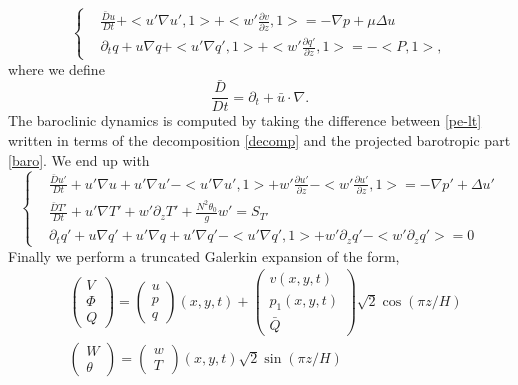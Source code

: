 \documentclass[11pt, a4paper, article,reqno,]{amsart}
\theoremstyle{remark}
\numberwithin{equation}{section}
\begin{document}
\begin{equation}\label{baro}
\left\{\begin{aligned}
    &\frac{\bar{D}u}{Dt} + < u' \nabla u', 1> + <w'\frac{\partial v}{\partial z},1> = -\nabla p + \mu \Delta u  \\
    & \partial_t q + u \nabla q + < u' \nabla q', 1 > + < w' \frac{\partial q'}{\partial z}, 1> = -<P,1>,
    \end{aligned}\right.
\end{equation}
where we define
\begin{equation*}
    \frac{\bar{D}}{Dt} = \partial_t + \bar u \cdot \nabla.
\end{equation*}
The baroclinic dynamics is computed by taking the difference between \eqref{pe-lt} written in terms of the decomposition \eqref{decomp} and the projected barotropic part \eqref{baro}. We end up with
\begin{equation}\label{barocli}
    \left\{\begin{aligned}
    &\frac{\bar{D}u'}{Dt} + u' \nabla u + u' \nabla u' - < u' \nabla u', 1> + w' \frac{\partial u'}{\partial z} - <w' \frac{\partial u'}{\partial z},1> = -\nabla p' + \Delta u'  \\
   & \frac{\bar{D}T'}{Dt} + u' \nabla T' + w' \partial_z T' + \frac{N^2\theta_0}{g} w' = S_{T'} \\
   &  \partial_t q' + u \nabla q' + u' \nabla q + u' \nabla q' - < u'\nabla q', 1> + w' \partial_z q' - < w' \partial_z q'> = 0
    \end{aligned}\right.
\end{equation}
Finally we perform a  truncated Galerkin expansion of the form, 
\begin{equation}\label{gal}
\begin{aligned}
		& \begin{pmatrix}
  V \\
  \Phi \\
  Q \end{pmatrix} = \begin{pmatrix}
  u \\
  p  \\
  q \end{pmatrix} (x,y,t) + \begin{pmatrix}
  v (x,y,t) \\
  p_1 (x,y,t) \\
  \bar{Q}\end{pmatrix}  \sqrt{2}\cos(\pi z /H)\\
  & \begin{pmatrix}
  W \\
  \theta \end{pmatrix} = \begin{pmatrix}
  w \\
  T \end{pmatrix} (x,y,t) \sqrt{2}\sin(\pi z /H) 
		\end{aligned}
\end{equation}
\end{document}
